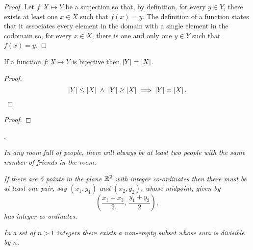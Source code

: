 \documentclass[../MathsNotesBase.tex]{subfiles}
\begin{document}
{		\bigskip
		\begin{proof}
			Let ${ f: X \longmapsto Y }$ be a surjection so that, by definition, for every ${ y \in Y }$, there exists at least one ${ x \in X }$ such that ${ f(x) = y }$. The definition of a function states that it associates every element in the domain with a single element in the codomain so, for every ${ x \in X }$, there is one and only one ${ y \in Y }$ such that ${ f(x) = y }$.
		\end{proof}
	
		\begin{corollary}
			If a function ${ f: X \longmapsto Y }$ is bijective then ${ \left\lvert Y\right\rvert = \left\lvert X\right\rvert }$.
		\end{corollary}
		\begin{proof}
			\[ \left\lvert Y\right\rvert \leq \left\lvert X\right\rvert \; \land \; \left\lvert Y\right\rvert \geq \left\lvert X\right\rvert \implies \left\lvert Y\right\rvert = \left\lvert X\right\rvert. \]
		\end{proof}
		
		\begin{proof}
		\end{proof}
		
		
		
		\sep
		\begin{exe}
			\ex \textit{In any room full of people, there will always be at least two people with the same number of friends in the room.}\\
			
			
			\ex \textit{If there are 5 points in the plane $\mathbb{R}^{2}$ with integer co-ordinates then there must be at least one pair, say $(x_1,y_1)$ and $(x_2,y_2)$, whose midpoint, given by
				\[ \left( \frac{x_1 + x_2}{2}, \, \frac{y_1 + y_2}{2} \right), \]
				has integer co-ordinates.}\\
			
			
			\ex \textit{In a set of ${ n > 1 }$ integers there exists a non-empty subset whose sum is divisible by $n$.}\\
			

\end{exe}}
\end{document}
